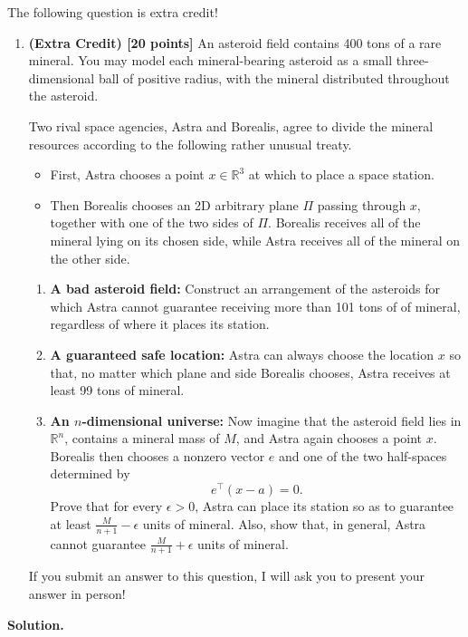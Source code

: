 \documentclass[11pt,letterpaper]{article}
\theoremstyle{definition}
\newcommand{\reals}{\mathbb{R}}
\newcommand{\solution}{\medskip\noindent\textbf{Solution.}\par\medskip}
\begin{document}
\vspace{\baselineskip}

The following question is extra credit!

\begin{enumerate}[resume]
\item \textbf{(Extra Credit) [20 points]} An asteroid field contains 400 tons of a rare mineral. You may model each mineral-bearing asteroid as a small three-dimensional ball of positive radius, with the mineral distributed throughout the asteroid.

Two rival space agencies, Astra and Borealis, agree to divide the mineral resources according to the following rather unusual treaty.
\begin{itemize}
\item First, Astra chooses a point $x\in\reals^3$ at which to place a space station.
\item Then Borealis chooses an 2D arbitrary plane $\Pi$ passing through $x$, together with one of the two sides of $\Pi$. Borealis receives all of the mineral lying on its chosen side, while Astra receives all of the mineral on the other side.
\end{itemize}
\begin{enumerate}
\item \textbf{A bad asteroid field:} Construct an arrangement of the asteroids for which Astra cannot guarantee receiving more than 101 tons of of mineral, regardless of where it places its station.
\item \textbf{A guaranteed safe location:} Astra can always choose the location $x$ so that, no matter which plane and side Borealis chooses, Astra receives at least 99 tons of mineral.
\item \textbf{An $n$-dimensional universe:} Now imagine that the asteroid field lies in $\reals^n$, contains a mineral mass of $M$, and Astra again chooses a point $x$. Borealis then chooses a nonzero vector $e$ and one of the two half-spaces determined by
\[
e^\top (x-a) = 0.
\]
Prove that for every $\epsilon > 0$, Astra can place its station so as to guarantee at least $\frac{M}{n+1} - \epsilon$ units of mineral. Also, show that, in general, Astra cannot guarantee $\frac{M}{n+1} + \epsilon$ units of mineral.
\end{enumerate}
If you submit an answer to this question, I will ask you to present your answer in person!
\end{enumerate}

\solution
\end{document}
